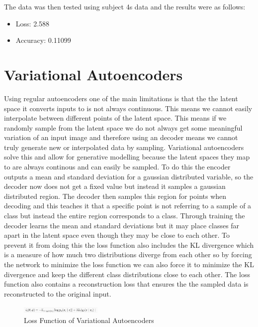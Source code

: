 \documentclass[conference]{IEEEtran}
\begin{document}
    The data was then tested using subject 4s data and the results were as follows:

    \begin{itemize}
        \item Loss: 2.588
        \item Accuracy: 0.11099
    \end{itemize}


    \section{Variational Autoencoders}

    Using regular autoencoders one of the main limitations is that the the latent space it converts inputs to is not always continuous. This means we cannot easily interpolate between different points of the latent space. This means if we randomly sample from the latent space we do not always get some meaningful variation of an input image and therefore using an decoder means we cannot truly generate new or interpolated data by sampling. Variational autoencoders solve this and allow for generative modelling because the latent spaces they map to are always continous and can easily be sampled. To do this the encoder outputs a mean and standard deviation for a gaussian distributed variable, so the decoder now does not get a fixed value but instead it samples a gaussian distributed region. The decoder then samples this region for points when decoding and this teaches it that a specific point is not referring to a sample of a class but instead the entire region corresponds to a class. Through training the decoder learns the mean and standard deviations but it may place classes far apart in the latent space even though they may be close to each other. To prevent it from doing this the loss function also includes the KL divergence which is a measure of how much two distributions diverge from each other so by forcing the network to minimize the loss function we can also force it to minimize the KL divergence and keep the different class distributions close to each other. The loss function also contains a reconstruction loss that ensures the the sampled data is reconstructed to the original input.

    \begin{figure}[H]
        \centering
        \captionsetup{justification=centering}
        \centering
            \includegraphics[width=0.35\textwidth]{48.png}
            \caption{Loss Function of Variational Autoencoders}
    \end{figure}
\end{document}
